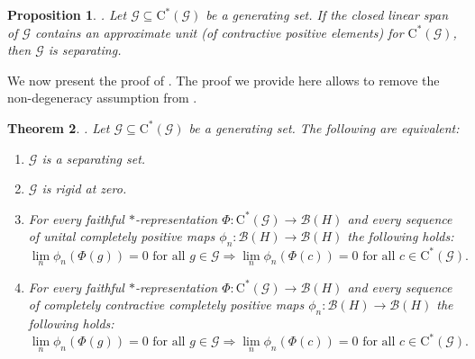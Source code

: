 \documentclass[11pt, draft]{amsart}
\numberwithin{equation}{section}
\theoremstyle{plain}
\newtheorem{theorem}{Theorem}[section]
\newtheorem{proposition}[theorem]{Proposition}
\theoremstyle{definition}
\theoremstyle{remark}
\newcommand{\B}{{\mathcal{B}}}
\newcommand{\G}{{\mathcal{G}}}
\newcommand{\foral}{\text{ for all }}
\newcommand{\ca}{\mathrm{C}^*}
\begin{document}
\begin{proposition} \label{P:unitcls} \cite[Proposition 3.6]{Sal17}.
Let $\G \subseteq \ca(\G)$ be a generating set.
If the closed linear span of $\G$ contains an approximate unit (of contractive positive elements) for $\ca(\G)$, then $\G$ is separating.
\end{proposition}

We now present the proof of \cite[Theorem 3.3]{Sal17}.
The proof we provide here allows to remove the non-degeneracy assumption from \cite[Theorem 3.3, item (ii)]{Sal17}.

\begin{theorem} \label{T:rigzero} \cite[Theorem 3.3]{Sal17}.
Let $\G \subseteq \ca(\G)$ be a generating set.
The following are equivalent:
\begin{enumerate}
\item $\G$ is a separating set.
\item $\G$ is rigid at zero.
\item For every faithful $*$-representation $\Phi \colon \ca(\G) \to \B(H)$ and every sequence of unital completely positive maps $\phi_n \colon \B(H) \to \B(H)$ the following holds:
\[
\lim_n \phi_n(\Phi(g))=0 \foral g \in \G
\Rightarrow
\lim_n \phi_n(\Phi(c))=0 \foral c \in \ca(\G).
\]
\item For every faithful $*$-representation $\Phi \colon \ca(\G) \to \B(H)$ and every sequence of completely contractive completely positive maps $\phi_n \colon \B(H) \to \B(H)$ the following holds:
\[
\lim_n \phi_n(\Phi(g))=0 \foral g \in \G
\Rightarrow
\lim_n \phi_n(\Phi(c))=0 \foral c \in \ca(\G).
\]
\end{enumerate}
\end{theorem}
\end{document}

